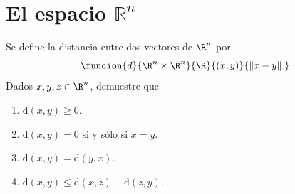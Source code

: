 \documentclass[a4,11pt]{aleph-notas}
\begin{document}
\encabezado


\section{El espacio $\mathbb{R}^n$}

\begin{ejer}
    Se define la distancia entre dos vectores de $\R^n$ por
    \[
        \funcion{d}{\R^n \times \R^n}{\R}{(x,y)}{\|x - y\|.}
    \]
    Dados $x,y,z\in\R^n$, demuestre que
    \begin{enumerate}
        \item 
        $\text{d}(x,y)\geq 0$.
        \item
        $\text{d}(x,y) = 0$ si y sólo si $x=y$.
        \item
        $\text{d}(x,y) = \text{d}(y,x)$.
        \item
        $\text{d}(x,y) \leq \text{d}(x,z) + \text{d}(z,y)$.
    \end{enumerate}
\end{ejer}
\end{document}
